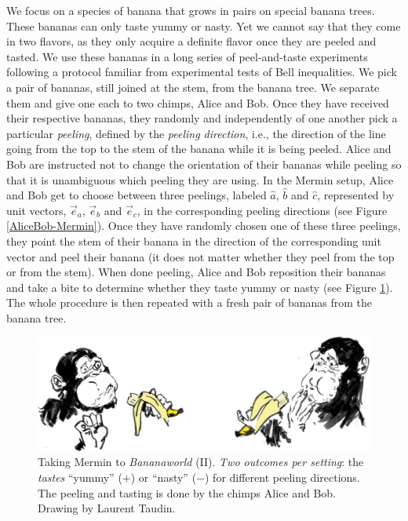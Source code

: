 We focus on a species of banana that grows in pairs on special banana trees. These bananas can only taste yummy or nasty. Yet we cannot say that they come in two flavors, as they only acquire a definite flavor once they are peeled and tasted. We use these bananas in a long series of peel-and-taste experiments following a protocol familiar from experimental tests of Bell inequalities. We pick a pair of bananas, still joined at the stem, from the banana tree. We separate them and give one each to two chimps, Alice and Bob. Once they have received their respective bananas, they randomly and independently of one another pick a particular \emph{peeling}, defined by the \emph{peeling direction}, i.e., the direction of the line going from the top to the stem of the banana while it is being peeled. Alice and Bob are instructed not to change the orientation of their bananas while peeling so that it is unambiguous which peeling they are using. In the Mermin setup, Alice and Bob get to choose between three peelings, labeled $\hat{a}$, $\hat{b}$ and $\hat{c}$, represented by unit vectors, $\vec{e}_a$, $\vec{e}_b$ and $\vec{e}_c$, in the corresponding peeling directions (see Figure \ref{AliceBob-Mermin}). Once they have randomly chosen one of these three peelings, they point the stem of their banana in the direction of the corresponding unit vector and peel their banana (it does not matter whether they peel from the top or from the stem). When done peeling, Alice and Bob reposition their bananas and take a bite to determine whether they taste yummy or nasty (see Figure \ref{AliceBob-tasting}). The whole procedure is then repeated with a fresh pair of bananas from the banana tree. 

\begin{figure}[h]
\centering
    \includegraphics[width=5.5in]{AliceBob-tasting.jpg}
 \caption{Taking Mermin to \emph{Bananaworld} (II). \emph{Two outcomes per setting}: the \emph{tastes} ``yummy'' ($+$) or ``nasty'' ($-$) for different peeling directions. The peeling and tasting is done by the chimps Alice and Bob. Drawing by Laurent Taudin.}
   \label{AliceBob-tasting}
\end{figure}

